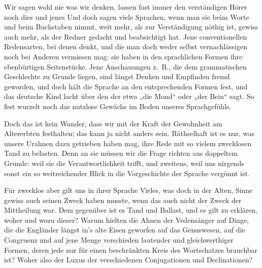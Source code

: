 Wir sagen wohl nie  was wir denken, lassen fast immer den \label{fp.343} verständigen Hörer noch dies und jenes  Und doch sagen viele Sprachen, wenn man sie beim Worte und beim Buchstaben nimmt, weit mehr, als zur Verständigung nöthig ist, gewiss auch mehr, als der Redner gedacht und beabsichtigt hat. Jene conventionellen Redensarten, bei denen  denkt, und die man doch weder selbst vernachlässigen noch bei Anderen vermissen mag: sie haben in den sprachlichen Formen ihre ebenbürtigen Seitenstücke. Jene Anschauungen z.~B., die dem grammatischen Geschlechte zu Grunde liegen, sind längst  Denken und Empfinden fremd geworden, und doch hält die Sprache an den entsprechenden Formen fest, und das deutsche Kind lacht über den  der etwa „die Mond“ oder „der Bein“ sagt. So fest wurzelt noch das nutzlose Gewächs im Boden unseres Sprachgefühls.

Doch das ist kein Wunder, dass wir mit der Kraft der Gewohnheit am Altererbten festhalten; das kann ja nicht anders sein. Räthselhaft ist es nur, was unsere Urahnen dazu getrieben haben mag, ihre Rede mit so vielem zweck\label{sp.361}losen Tand zu belasten. Denn an sie müssen wir die Frage richten aus doppeltem Grunde:  weil sie die Verantwortlichkeit trifft, und zweitens, weil uns nirgends sonst ein so weitreichender Blick in die Vorgeschichte der Sprache vergönnt ist.

Für zwecklos aber gilt uns in ihrer Sprache Vieles, was doch in  der Alten, Sinne gewiss auch seinen Zweck haben musste, wenn das auch nicht der Zweck der Mittheilung war.  Dem gegenüber ist es Tand und Ballast, und es gilt zu erklären, woher und wozu dieser? Warum hielten die Ahnen der Vedensänger auf Dinge, die die Engländer längst in’s alte Eisen geworfen  auf das Genuswesen, auf die Congruenz und auf jene Menge verschieden lautender und gleichwerthiger Formen, deren jede nur für einen beschränkten Kreis des Wortschatzes brauchbar ist? Woher also der Luxus der verschiedenen Conjugationen und Declinationen?

